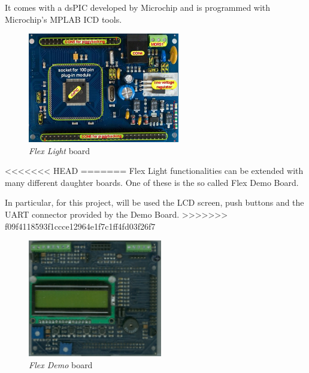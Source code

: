 \documentclass[twoside]{article}
\begin{document}
\begin{multicols}{2}
It comes with a dsPIC developed by Microchip and is programmed with Microchip's MPLAB ICD tools.

\begin{figure}[H]
  \centering
  \includegraphics[width=2.6in]{img/flex_light_presentation}
  \caption{\textit{Flex Light} board}
\end{figure}




<<<<<<< HEAD
=======
Flex Light functionalities can be extended with many different daughter boards.
One of these is the so called Flex Demo Board.

In particular, for this project, will be used the LCD screen, push buttons and the UART connector provided by the Demo Board.
>>>>>>> f09f4118593f1ccce12964e1f7c1ff4fd03f26f7

\begin{figure}[H]
  \centering
  \includegraphics[width=2.3in]{img/flex_demo_board_presentation}
  \caption{\textit{Flex Demo} board}
\end{figure}


\end{multicols}
\end{document}

